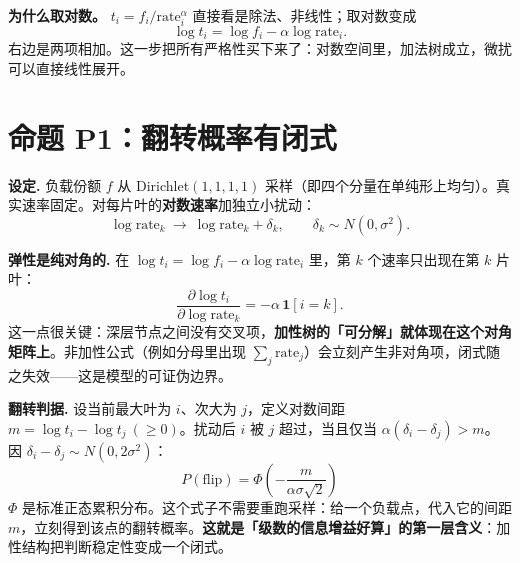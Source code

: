 \documentclass[12pt]{ctexart}
\newcommand{\rate}{\mathrm{rate}}
\newcommand{\flip}{\mathrm{flip}}
\begin{document}
\begin{table}[htbp]
\centering\small
{}
\end{table}

\textbf{为什么取对数。} $t_i=f_i/\rate_i^{\alpha}$ 直接看是除法、非线性；取对数变成
\[
\log t_i=\log f_i-\alpha\log\rate_i .
\]
右边是两项相加。这一步把所有严格性买下来了：对数空间里，加法树成立，微扰可以直接线性展开。

\section{命题 P1：翻转概率有闭式}

\textbf{设定.} 负载份额 $f$ 从 Dirichlet$(1,1,1,1)$ 采样（即四个分量在单纯形上均匀）。真实速率固定。对每片叶的\textbf{对数速率}加独立小扰动：
\[
\log\rate_k\ \to\ \log\rate_k+\delta_k,\qquad \delta_k\sim N(0,\sigma^2).
\]

\textbf{弹性是纯对角的.} 在 $\log t_i=\log f_i-\alpha\log\rate_i$ 里，第 $k$ 个速率只出现在第 $k$ 片叶：
\[
\frac{\partial\log t_i}{\partial\log\rate_k}=-\alpha\,\mathbf{1}[i=k].
\]
这一点很关键：深层节点之间没有交叉项，\textbf{加性树的「可分解」就体现在这个对角矩阵上}。非加性公式（例如分母里出现 $\sum_j\rate_j$）会立刻产生非对角项，闭式随之失效——这是模型的可证伪边界。

\textbf{翻转判据.} 设当前最大叶为 $i$、次大为 $j$，定义对数间距 $m=\log t_i-\log t_j\ (\ge 0)$。扰动后 $i$ 被 $j$ 超过，当且仅当 $\alpha(\delta_i-\delta_j)>m$。因 $\delta_i-\delta_j\sim N(0,2\sigma^2)$：
\[
\boxed{P(\flip)=\Phi\!\left(-\frac{m}{\alpha\sigma\sqrt2}\right)}
\]
$\Phi$ 是标准正态累积分布。这个式子不需要重跑采样：给一个负载点，代入它的间距 $m$，立刻得到该点的翻转概率。\textbf{这就是「级数的信息增益好算」的第一层含义}：加性结构把判断稳定性变成一个闭式。
\end{document}
